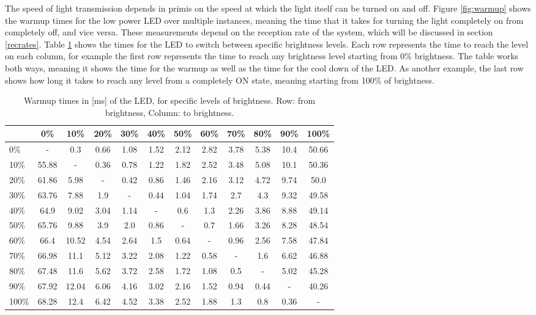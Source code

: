 The speed of light transmission depends in primis on the speed at which the light itself can be turned on and off.
Figure \ref{fig:warmup} shows the warmup times for the low power LED over multiple instances, meaning the time that it takes for turning the light completely on from completely off, and vice versa.
These measurements depend on the reception rate of the system, which will be discussed in section \ref{recrates}.
Table \ref{tab:warmup} shows the times for the LED to switch between specific brightness levels.
Each row represents the time to reach the level on each column, for example the first row represents the time to reach any brightness level starting from 0\% brightness.
The table works both ways, meaning it shows the time for the warmup as well as the time for the cool down of the LED.
As another example, the last row shows how long it takes to reach any level from a completely ON state, meaning starting from 100\% of brightness.

\begin{table}[hbt]
\centering
  \begin{tabular}{ l | c c c c c c c c c c c}
    & 0\% & 10\% & 20\% & 30\% & 40\% & 50\% & 60\% & 70\% & 80\% & 90\% & 100\% \\
    \hline
0\% & - & 0.3 & 0.66 & 1.08 & 1.52 & 2.12 & 2.82 & 3.78 & 5.38 & 10.4 & 50.66 \\
10\% & 55.88 & - & 0.36 & 0.78 & 1.22 & 1.82 & 2.52 & 3.48 & 5.08 & 10.1 & 50.36 \\
20\% & 61.86 & 5.98 & - & 0.42 & 0.86 & 1.46 & 2.16 & 3.12 & 4.72 & 9.74 & 50.0 \\
30\% & 63.76 & 7.88 & 1.9 & - & 0.44 & 1.04 & 1.74 & 2.7 & 4.3 & 9.32 & 49.58 \\
40\% & 64.9 & 9.02 & 3.04 & 1.14 & - & 0.6 & 1.3 & 2.26 & 3.86 & 8.88 & 49.14 \\
50\% & 65.76 & 9.88 & 3.9 & 2.0 & 0.86 & - & 0.7 & 1.66 & 3.26 & 8.28 & 48.54 \\
60\% & 66.4 & 10.52 & 4.54 & 2.64 & 1.5 & 0.64 & - & 0.96 & 2.56 & 7.58 & 47.84 \\
70\% & 66.98 & 11.1 & 5.12 & 3.22 & 2.08 & 1.22 & 0.58 & - & 1.6 & 6.62 & 46.88 \\
80\% & 67.48 & 11.6 & 5.62 & 3.72 & 2.58 & 1.72 & 1.08 & 0.5 & - & 5.02 & 45.28 \\
90\% & 67.92 & 12.04 & 6.06 & 4.16 & 3.02 & 2.16 & 1.52 & 0.94 & 0.44 & - & 40.26 \\
100\% & 68.28 & 12.4 & 6.42 & 4.52 & 3.38 & 2.52 & 1.88 & 1.3 & 0.8 & 0.36 & - \\
  \end{tabular}
  \centering
  \caption{Warmup times in [ms] of the LED, for specific levels of brightness. Row: from brightness, Column: to brightness.}
  \label{tab:warmup}
\end{table}

